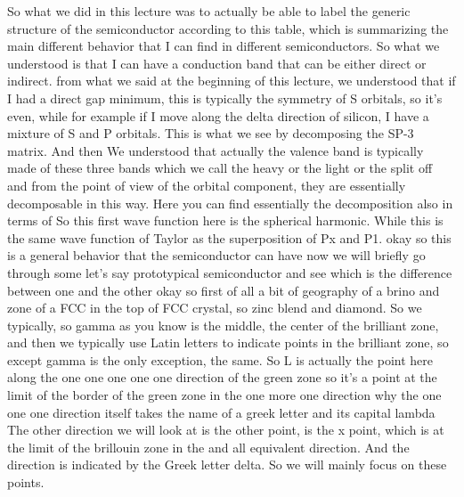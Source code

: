 So what we did in this lecture was to actually be able to label the generic structure of the semiconductor according to this table, which is summarizing the main different behavior that I can find in different semiconductors. So what we understood is that I can have a conduction band that can be either direct or indirect. from what we said at the beginning of this lecture, we understood that if I had a direct gap minimum, this is typically the symmetry of S orbitals, so it's even, while for example if I move along the delta direction of silicon, I have a mixture of S and P orbitals. This is what we see by decomposing the SP-3 matrix. And then We understood that actually the valence band is typically made of these three bands which we call the heavy or the light or the split off and from the point of view of the orbital component, they are essentially decomposable in this way. Here you can find essentially the decomposition also in terms of So this first wave function here is the spherical harmonic. While this is the same wave function of Taylor as the superposition of Px and P1. okay so this is a general behavior that the semiconductor can have now we will briefly go through some let's say prototypical semiconductor and see which is the difference between one and the other okay so first of all a bit of geography of a brino and zone of a FCC in the top of FCC crystal, so zinc blend and diamond.
So we typically, so gamma as you know is the middle, the center of the brilliant zone, and then we typically use Latin letters to indicate points in the brilliant zone, so except gamma is the only exception, the same. So L is actually the point here along the one one one one one direction of the green zone so it's a point at the limit of the border of the green zone in the one more one direction why the one one one direction itself takes the name of a greek letter and its capital lambda The other direction we will look at is the other point, is the x point, which is at the limit of the brillouin zone in the and all equivalent direction. And the direction is indicated by the Greek letter delta. So we will mainly focus on these points.
